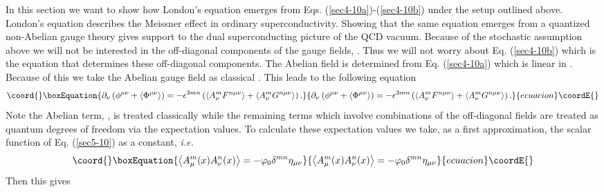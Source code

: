 \documentclass[a4paper,aps,showpacs]{revtex4}
\begin{document}
In this section we want to show how London's equation emerges
from Eqs. (\ref{sec4-10a})-(\ref{sec4-10b}) under the setup
outlined above. London's equation describes the Meissner effect in
ordinary superconductivity. Showing that the same equation
emerges from a quantized non-Abelian gauge theory gives support
to the dual superconducting picture of the QCD vacuum.
Because of the stochastic assumption above we will not be
interested in the off-diagonal components of the gauge fields,
\coordHE{}. Thus we will not
worry about Eq. (\ref{sec4-10b}) which is the equation that
determines these off-diagonal components. The Abelian field
\coordHE{} is determined from Eq. (\ref{sec4-10a}) which is
linear in \coordHE{}. Because of this we take the Abelian gauge field
as classical \cite{dzhsin}. This leads to the following equation
\begin{equation}\coord{}\boxEquation{
  \partial_\nu \left(
  \phi^{\mu\nu} + \left\langle \Phi ^{\mu\nu} \right\rangle
  \right) = - \epsilon^{3mn}
  \left(
  \left\langle A^m_\nu F^{n\mu\nu} \right\rangle +
  \left\langle A^m_\nu G^{n\mu\nu} \right\rangle
  \right) .
\label{sec6-10}
}{
  \partial_\nu \left(
  \phi^{\mu\nu} + \left\langle \Phi ^{\mu\nu} \right\rangle
  \right) = - \epsilon^{3mn}
  \left(
  \left\langle A^m_\nu F^{n\mu\nu} \right\rangle +
  \left\langle A^m_\nu G^{n\mu\nu} \right\rangle
  \right) .
}{ecuacion}\coordE{}\end{equation}
Note the Abelian term, \myHighlight{$\phi^{\mu\nu}$}\coordHE{}, is treated classically while
the remaining terms which involve combinations of the off-diagonal
fields are treated as quantum degrees of freedom via
the expectation values. To calculate these expectation values
we take, as a first approximation, the scalar function of Eq.
(\ref{sec5-10}) as a constant, {\it i.e.} \coordHE{}
\begin{equation}\coord{}\boxEquation{
  \left\langle A^m_\mu (x) A^n_\nu (x) \right\rangle =
  -\varphi_0 \delta^{mn} \eta_{\mu\nu}
\label{sec6-20}
}{
  \left\langle A^m_\mu (x) A^n_\nu (x) \right\rangle =
  -\varphi_0 \delta^{mn} \eta_{\mu\nu}
}{ecuacion}\coordE{}\end{equation}
Then this gives
\end{document}
